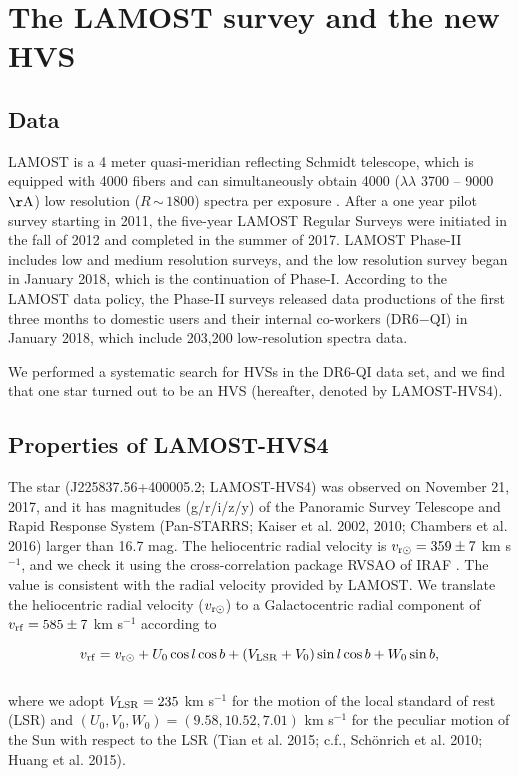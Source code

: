 \documentclass[iop, aj]{emulateapj}
\begin{document}
\section{The LAMOST survey and the new HVS}
\subsection{Data}
LAMOST is a 4 meter quasi-meridian reflecting Schmidt telescope, which is equipped with 4000 fibers and can simultaneously obtain 4000 ($\lambda\lambda$ 3700 -- 9000 $\rm\AA$) low resolution ($R$\,$\sim$\,$1800$) spectra per exposure \citep{1996ApOpt..35.5155W, 2004ChJAA...4....1S, 2012RAA....12..723Z, 2012RAA....12.1243L, 2012RAA....12.1197C}.
After a one year pilot survey starting in 2011, the five-year LAMOST Regular Surveys were initiated in the fall of 2012 and completed in the summer of 2017. LAMOST Phase-II includes low and medium resolution surveys, and the low resolution survey began in January 2018, which is the continuation of Phase-I. According to the LAMOST data policy, the Phase-II surveys released data productions of the first three months to domestic users and their internal co-workers (DR6$-$QI) in January 2018, which include 203,200 low-resolution spectra data.

We performed a systematic search for HVSs in the DR6-QI data set, and we find that one star turned out to be an HVS (hereafter, denoted by LAMOST-HVS4).

\subsection{Properties of LAMOST-HVS4}

The star (J225837.56+400005.2; LAMOST-HVS4) was observed on November 21, 2017, and it has magnitudes (g/r/i/z/y) of the Panoramic
Survey Telescope and Rapid Response System (Pan-STARRS; Kaiser et al. 2002, 2010; Chambers et al. 2016) larger than 16.7 mag.
The heliocentric radial velocity is $v_{\rm r\odot}=359 \pm 7$ km s$^{-1}$, and we check it using the cross-correlation package RVSAO of IRAF \citep{1998PASP..110..934K}. The value is  consistent with the radial velocity provided by LAMOST. We translate the heliocentric radial velocity ($v_{\rm r\odot}$) to a Galactocentric radial component of $v_{\rm rf}=585 \pm 7$ km s$^{-1}$ according to

\begin{equation}
v_{\rm rf}=v_{\rm r\odot} + U_0\cos l \cos b + (V_{\rm LSR}+V_0)\sin l \cos b + W_0\sin b,
\end{equation} \\
where we adopt $V_{\rm LSR} = 235$ km s$^{-1}$ for the motion of the local standard of rest (LSR) \citep{2005ApJ...629..268H, 2012ApJ...759..131B, 2014ApJ...783..130R} and $(U_0, V_0, W_0)=(9.58, 10.52, 7.01)$ km s$^{-1}$ for the peculiar motion of the Sun with respect to the LSR (Tian et al. 2015; c.f., Sch\"{o}nrich et al. 2010; Huang et al. 2015).
\end{document}

